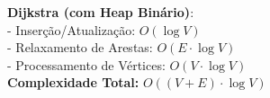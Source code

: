 \documentclass[preview]{standalone}
\begin{document}
\begin{center}
\textbf{Dijkstra (com Heap Binário)}:\\
            - Inserção/Atualização: $O(\log V)$\\
            - Relaxamento de Arestas: $O(E \cdot \log V)$\\
            - Processamento de Vértices: $O(V \cdot \log V)$\\
            \textbf{Complexidade Total:} $O((V + E) \cdot \log V)$
\end{center}
\end{document}
